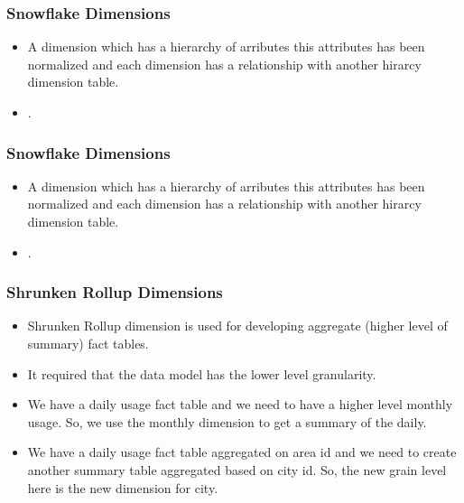 \begin{frame}
    \frametitle{Snowflake Dimensions}
    \begin{itemize}[<+->]
        \item A dimension which has a hierarchy of arributes this attributes has been normalized and each dimension has a relationship with another hirarcy dimension table.\\
        \item {}.
    \end{itemize}
\end{frame}
\begin{frame}
    \frametitle{Snowflake Dimensions}
    \begin{itemize}
        \item A dimension which has a hierarchy of arributes this attributes has been normalized and each
        dimension has a relationship with another hirarcy dimension table.\\
        \item {}.
    \end{itemize}
    \centering
    
\end{frame}
\begin{frame}
    \frametitle{Shrunken Rollup Dimensions}%
    \begin{itemize}[<+->]    	
		\item Shrunken Rollup dimension is used for developing aggregate (higher level of summary) fact tables. 
		\item It required that the data model has the lower level granularity.
	\end{itemize}
		\begin{example}
		    \begin{itemize}[<+->]    	
			\item We have a daily usage fact table and we need to have a higher level monthly usage. So, we use the monthly dimension to get a summary of the daily.
			\item We have a daily usage fact table aggregated on area id and we need to create another summary table aggregated based on city id. So, the new grain level here is the new dimension for city.
			\end{itemize}
		\end{example}
\end{frame}
